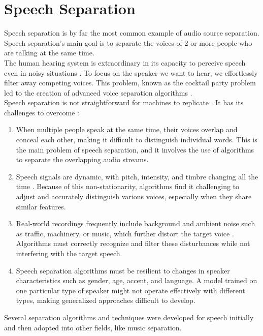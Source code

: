 \section{Speech Separation}
Speech separation is by far the most common example of audio source separation. Speech separation's main goal is to separate the voices of 2 or more people who are talking at the same time. \\
The human hearing system is extraordinary in its capacity to perceive speech even in noisy situations \cite{mesgarani2012}. To focus on the speaker we want to hear, we effortlessly filter away competing voices. This problem, known as the cocktail party problem led to the creation of advanced voice separation algorithms \cite{agrawal2023b}.\\
Speech separation is not straightforward for machines to replicate \cite{agrawal2023a}. It has its challenges to overcome \cite{agrawal2023b}:
\begin{enumerate}
    \item When multiple people speak at the same time, their voices overlap and conceal each other, making it difficult to distinguish individual words. This is the main problem of speech separation, and it involves the use of algorithms to separate the overlapping audio streams.
    \item Speech signals are dynamic, with pitch, intensity, and timbre changing all the time \cite{town2013}. Because of this non-stationarity, algorithms find it challenging to adjust and accurately distinguish various voices, especially when they share similar features.
    \item Real-world recordings frequently include background and ambient noise such as traffic, machinery, or music, which further distort the target voice \cite{lee2015}. Algorithms must correctly recognize and filter these disturbances while not interfering with the target speech.
    \item Speech separation algorithms must be resilient to changes in speaker characteristics such as gender, age, accent, and language. A model trained on one particular type of speaker might not operate effectively with different types, making generalized approaches difficult to develop.
\end{enumerate}
Several separation algorithms and techniques were developed for speech initially and then adopted into other fields, like music separation.

